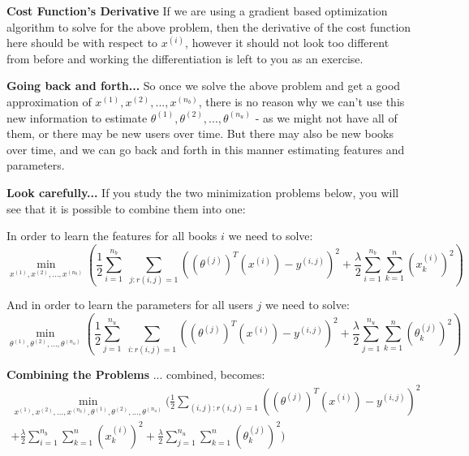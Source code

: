 \documentclass[xcolor=dvipsnames]{beamer}
\begin{document}
\begin{frame}
{\bf Cost Function's Derivative}
If we are using a gradient based optimization algorithm to solve for the above problem, then the derivative of the cost function here should be with respect to $x^{(i)}$, \vfill\pause however it should not look too different from before and working the differentiation is left to you as an exercise.\\
\end{frame}

\begin{frame}
{\bf Going back and forth...}
So once we solve the above problem and get a good approximation of $x^{(1)}, x^{(2)}, ..., x^{(n_b)}$, there is no reason why we can't use this new information to estimate $\theta^{(1)}, \theta^{(2)}, ..., \theta^{(n_u)}$ \vfill\pause - as we might not have all of them, or there may be new users over time. \vfill\pause But there may also be new books over time, and we can go back and forth in this manner estimating features and parameters. \\
\end{frame}

\begin{frame}
{\bf Look carefully...}
If you study the two minimization problems below, you will see that it is possible to combine them into one: \vfill\pause

In order to learn the features for all books $i$ we need to solve:
\[
\min_{x^{(1)}, x^{(2)}, ..., x^{(n_b)}} \left(\frac{1}{2} \sum_{i=1}^{n_b}\;\sum_{j:r(i,j)=1}((\theta^{(j)})^T(x^{(i)}) - y^{(i,j)})^2 + \frac{\lambda}{2}\sum_{i=1}^{n_b}\sum_{k=1}^n(x^{(i)}_k)^2\right)\]

\vfill\pause
And in order to learn the parameters for all users $j$ we need to solve:
\[
\min_{\theta^{(1)}, \theta^{(2)}, ..., \theta^{(n_u)}} \left(\frac{1}{2} \sum_{j=1}^{n_u}\;\sum_{i:r(i,j)=1}((\theta^{(j)})^T(x^{(i)}) - y^{(i,j)})^2 + \frac{\lambda}{2}\sum_{j=1}^{n_u}\sum_{k=1}^n(\theta^{(j)}_k)^2\right)\]
\end{frame}

\begin{frame}
{\bf Combining the Problems}
... combined, becomes:
\begin{eqnarray*}
\min_{x^{(1)}, x^{(2)}, ..., x^{(n_b)}, \theta^{(1)}, \theta^{(2)}, ..., \theta^{(n_u)}} \Bigg(\frac{1}{2} \sum_{(i,j):r(i,j)=1}((\theta^{(j)})^T(x^{(i)}) - y^{(i,j)})^2 \\ + \frac{\lambda}{2}\sum_{i=1}^{n_b}\sum_{k=1}^n(x^{(i)}_k)^2 + \frac{\lambda}{2}\sum_{j=1}^{n_u}\sum_{k=1}^n(\theta^{(j)}_k)^2\Bigg)
\end{eqnarray*}
\end{frame}
\end{document}

